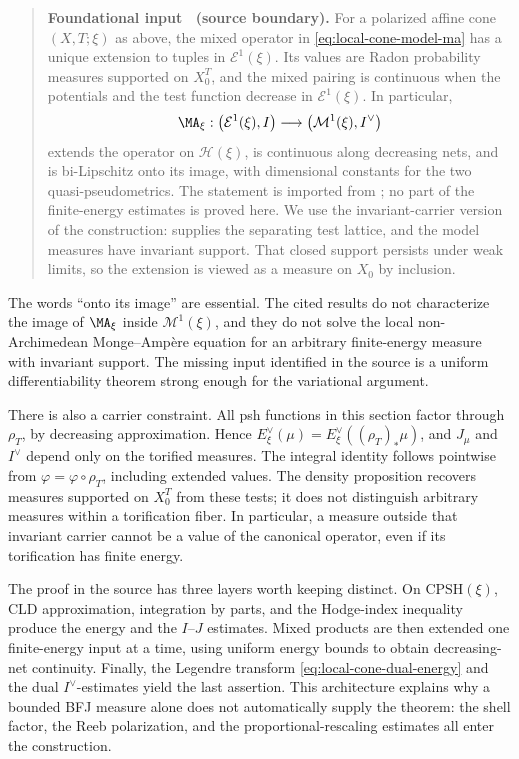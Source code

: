 \label{thm:local-cone-finite-energy-ma}
\begin{quote}
\textbf{Foundational input \thetheorem\ (source boundary).}
For a polarized affine cone $(X,T;\xi)$ as above, the mixed operator in
\eqref{eq:local-cone-model-ma} has a unique extension to tuples in
$\mathcal E^1(\xi)$.  Its values are Radon probability measures supported
on $X_0^T$, and the mixed pairing is continuous when the potentials and the
test function decrease in $\mathcal E^1(\xi)$.  In particular,
\[
 \MA_\xi:\bigl(\mathcal E^1(\xi),I\bigr)
       \longrightarrow\bigl(\mathcal M^1(\xi),I^\vee\bigr)
\]
extends the operator on $\mathcal H(\xi)$, is continuous along decreasing
nets, and is bi-Lipschitz onto its image, with dimensional constants for the
two quasi-pseudometrics.  The statement is imported from
\cite[Theorem~1.1, Theorem~6.3, and Corollary~7.8]{Wu24AffineCones}; no part
of the finite-energy estimates is proved here.  We use the invariant-carrier
version of the construction: 
supplies the separating test lattice, and the model measures have invariant
support.  That closed support persists under weak limits, so the extension
is viewed as a measure on $X_0$ by inclusion.
\end{quote}

The words ``onto its image'' are essential.  The cited results do not
characterize the image of $\MA_\xi$ inside $\mathcal M^1(\xi)$, and
they do not solve the local non-Archimedean Monge--Amp\`ere equation for an
arbitrary finite-energy measure with invariant support.  The missing input identified in the
source is a uniform differentiability theorem strong enough for the
variational argument.

There is also a carrier constraint.  All psh functions in this section
factor through $\rho_T$, by decreasing approximation.  Hence
$E_\xi^\vee(\mu)=E_\xi^\vee((\rho_T)_*\mu)$, and
$J_\mu$ and $I^\vee$ depend only on the torified measures.  The
integral identity follows pointwise from
$\varphi=\varphi\circ\rho_T$, including extended values.  The density
proposition recovers measures supported on $X_0^T$ from these tests; it
does not distinguish arbitrary measures within a torification fiber.
In particular, a measure outside that invariant carrier cannot be a value
of the canonical operator, even if its torification has finite energy.

The proof in the source has three layers worth keeping distinct.  On
$\mathrm{CPSH}(\xi)$, CLD approximation, integration by parts, and the
Hodge-index inequality produce the energy and the $I$--$J$ estimates.
Mixed products are then extended one finite-energy input at a time, using
uniform energy bounds to obtain decreasing-net continuity.  Finally, the
Legendre transform \eqref{eq:local-cone-dual-energy} and the dual
$I^\vee$-estimates yield the last assertion.  This architecture explains
why a bounded BFJ measure alone does not automatically supply the theorem:
the shell factor, the Reeb polarization, and the proportional-rescaling
estimates all enter the construction.

